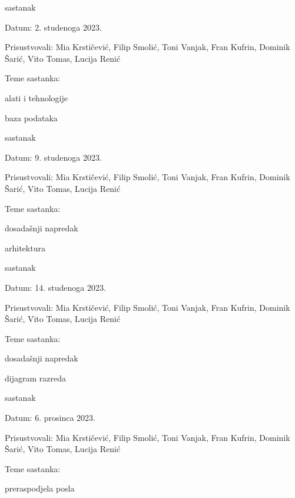 \begin{packed_enum}
			\item  sastanak
			\item[] \begin{packed_item}
				\item Datum: 2. studenoga 2023.
				\item Prisustvovali: Mia Krstičević, Filip Smolić, Toni Vanjak, Fran Kufrin, Dominik Šarić, Vito Tomas, Lucija Renić
				\item Teme sastanka:
				\begin{packed_item}
					\item  alati i tehnologije
					\item baza podataka
				\end{packed_item}
			\end{packed_item}
			
			\item  sastanak
			\item[] \begin{packed_item}
				\item Datum: 9. studenoga 2023.
				\item Prisustvovali: Mia Krstičević, Filip Smolić, Toni Vanjak, Fran Kufrin, Dominik Šarić, Vito Tomas, Lucija Renić
				\item Teme sastanka:
				\begin{packed_item}
					\item dosadašnji napredak
					\item arhitektura
				\end{packed_item}
			\end{packed_item}
			
			\item  sastanak
			\item[] \begin{packed_item}
				\item Datum: 14. studenoga 2023.
				\item Prisustvovali: Mia Krstičević, Filip Smolić, Toni Vanjak, Fran Kufrin, Dominik Šarić, Vito Tomas, Lucija Renić
				\item Teme sastanka:
				\begin{packed_item}
					\item dosadašnji napredak
					\item dijagram razreda
				\end{packed_item}
			\end{packed_item}
			
			\item  sastanak
			\item[] \begin{packed_item}
				\item Datum: 6. prosinca 2023.
				\item Prisustvovali: Mia Krstičević, Filip Smolić, Toni Vanjak, Fran Kufrin, Dominik Šarić, Vito Tomas, Lucija Renić
				\item Teme sastanka:
				\begin{packed_item}
					\item preraspodjela posla
				\end{packed_item}
			\end{packed_item}
			

\end{packed_enum}

